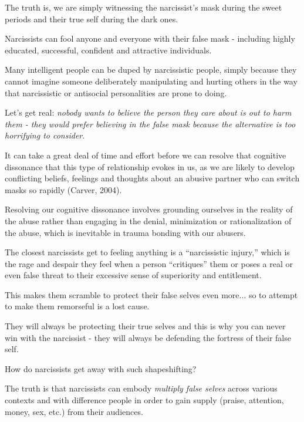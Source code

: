 \documentclass[oneside]{book}
\numberwithin{equation}{section}
\begin{document}
The truth is, we are simply witnessing the narcissist's mask during the sweet periods and their true self during the dark ones.

%
Narcissists can fool anyone and everyone with their false mask - including highly educated, successful, confident and attractive individuals.

Many intelligent people can be duped by narcissistic people, simply because they cannot imagine someone deliberately manipulating and hurting others in the way that narcissistic or antisocial personalities are prone to doing.

Let's get real: \textit{nobody wants to believe the person they care about is out to harm them - they would prefer believing in the false mask because the alternative is too horrifying to consider}.

%
It can take a great deal of time and effort before we can resolve that cognitive dissonance that this type of relationship evokes in us, as we are likely to develop conflicting beliefs, feelings and thoughts about an abusive partner who can switch masks so rapidly (Carver, 2004).

Resolving our cognitive dissonance involves grounding ourselves in the reality of the abuse rather than engaging in the denial, minimization or rationalization of the abuse, which is inevitable in trauma bonding with our abusers.

%

The closest narcissists get to feeling anything is a ``narcissistic injury,'' which is the rage and despair they feel when a person ``critiques'' them or poses a real or even false threat to their excessive sense of superiority and entitlement.

This makes them scramble to protect their false selves even more$\ldots$ so to attempt to make them remorseful is a lost cause.

They will always be protecting their true selves and this is why you can never win with the narcissist - they will always be defending the fortress of their false self.

%
How do narcissists get away with such shapeshifting?

The truth is that narcissists can embody \textit{multiply false selves} across various contexts and with difference people in order to gain supply (praise, attention, money, sex, etc.) from their audiences.
\end{document}

